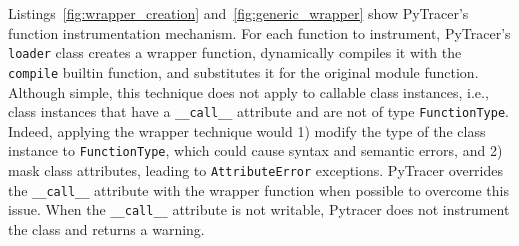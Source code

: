 \documentclass[11pt]{article}
\newcommand{\tristan}[1]{\color{orange}\textbf{From Tristan:} #1\color{black}\xspace}
\newcommand{\Yohan}[1]{\color{green!75!black}\textbf{Yohan:} #1\color{black}\xspace}
\newcommand{\pytracer}[0]{PyTracer\xspace}
\begin{document}
Listings~\ref{fig:wrapper_creation} and~\ref{fig:generic_wrapper} show \pytracer's function instrumentation mechanism.
For each function to instrument, \pytracer's \texttt{loader} class creates a wrapper function, dynamically compiles it with the \texttt{compile} builtin function, and substitutes it for the original module function.  Although simple, this technique does not apply to callable class instances, i.e., class instances that have a \texttt{\_\_call\_\_} attribute and are not of type \texttt{FunctionType}. Indeed, applying the wrapper technique would 1) modify the type of the class instance to \texttt{FunctionType}, which could cause syntax and semantic errors, and 2) mask class attributes, leading to \texttt{AttributeError} exceptions.
\pytracer overrides the \texttt{\_\_call\_\_} attribute with the wrapper function when possible to overcome this issue.
When the \texttt{\_\_call\_\_} attribute is not writable,  Pytracer does not instrument the class and returns a warning. 



\end{document}
